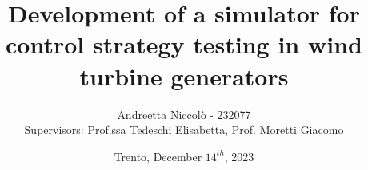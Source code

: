 \author{{\Large Andreetta Niccolò - 232077}\\[2\baselineskip]
Supervisors: Prof.ssa Tedeschi Elisabetta, Prof. Moretti Giacomo}
\title{Development of a simulator for control strategy testing in wind turbine generators}
\subtitle{}
\date{Trento, December $14^{th}$, 2023}
{
\begin{frame}[plain]
    \maketitle
\end{frame}

}